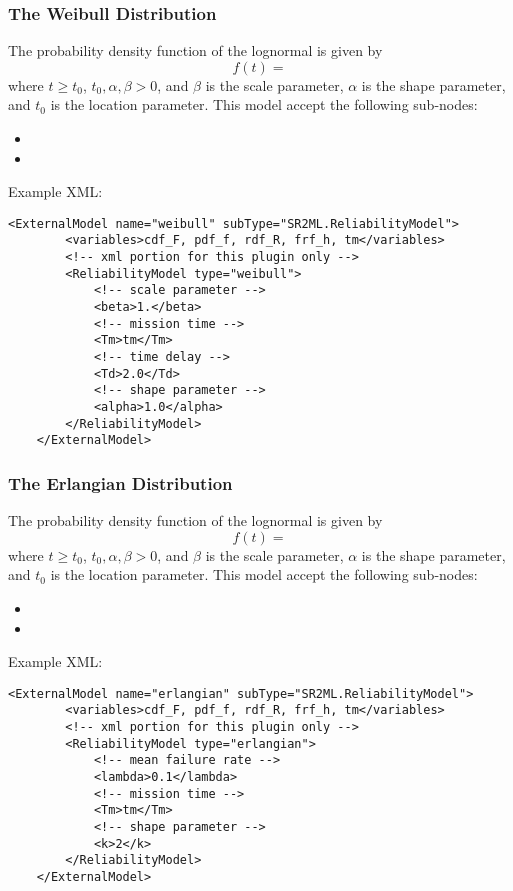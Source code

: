 \subsubsection{The Weibull Distribution}
The probability density function of the lognormal is given by
\begin{equation}
	f(t) =
\end{equation}
where $t\geq t_0$, $t_0, \alpha, \beta >0$, and $\beta$ is the scale parameter, $\alpha$ is the shape
parameter, and $t_0$ is the location parameter.
This model accept the following sub-nodes:
\begin{itemize}
	\item {}
	\item {}
\end{itemize}

Example XML:
\begin{lstlisting}[style=XML]
	<ExternalModel name="weibull" subType="SR2ML.ReliabilityModel">
		<variables>cdf_F, pdf_f, rdf_R, frf_h, tm</variables>
		<!-- xml portion for this plugin only -->
		<ReliabilityModel type="weibull">
			<!-- scale parameter -->
			<beta>1.</beta>
			<!-- mission time -->
			<Tm>tm</Tm>
			<!-- time delay -->
			<Td>2.0</Td>
			<!-- shape parameter -->
			<alpha>1.0</alpha>
		</ReliabilityModel>
	</ExternalModel>
\end{lstlisting}

\subsubsection{The Erlangian Distribution}
The probability density function of the lognormal is given by
\begin{equation}
	f(t) =
\end{equation}
where $t\geq t_0$, $t_0, \alpha, \beta >0$, and $\beta$ is the scale parameter, $\alpha$ is the shape
parameter, and $t_0$ is the location parameter.
This model accept the following sub-nodes:
\begin{itemize}
	\item {}
	\item {}
\end{itemize}

Example XML:
\begin{lstlisting}[style=XML]
	<ExternalModel name="erlangian" subType="SR2ML.ReliabilityModel">
		<variables>cdf_F, pdf_f, rdf_R, frf_h, tm</variables>
		<!-- xml portion for this plugin only -->
		<ReliabilityModel type="erlangian">
			<!-- mean failure rate -->
			<lambda>0.1</lambda>
			<!-- mission time -->
			<Tm>tm</Tm>
			<!-- shape parameter -->
			<k>2</k>
		</ReliabilityModel>
	</ExternalModel>
\end{lstlisting}


